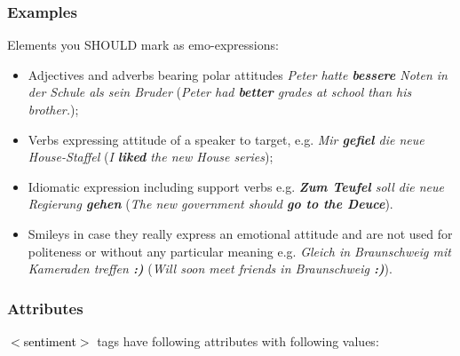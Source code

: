 \documentclass[11pt,a4paper]{article}
\newcommand{\xmltag}[1]{\textcolor{black}{{\small$<$#1$>$}}}
\begin{document}
\subsubsection{Examples}
Elements you SHOULD mark as emo-expressions:
\begin{itemize}
  \item Adjectives and adverbs bearing polar attitudes \textit{Peter
    hatte \textbf{bessere} Noten in der Schule als sein Bruder}
    (\textit{Peter had \textbf{better} grades at school than his
    brother.});

  \item Verbs expressing attitude of a speaker to target,
    e.g. \textit{Mir \textbf{gefiel} die neue House-Staffel}
    (\textit{I \textbf{liked} the new House series});

  \item Idiomatic expression including support verbs
    e.g. \textit{\textbf{Zum Teufel} soll die neue Regierung
      \textbf{gehen}} (\textit{The new government should \textbf{go to
        the Deuce}}).

  \item Smileys in case they really express an emotional attitude and
    are not used for politeness or without any particular meaning
    e.g. \textit{Gleich in Braunschweig mit Kameraden treffen
        \textbf{:)}} (\textit{Will soon meet friends in Braunschweig
        \textbf{:)}}).
\end{itemize}

\subsubsection{Attributes}
\xmltag{sentiment} tags have following attributes with following
values:
\end{document}
